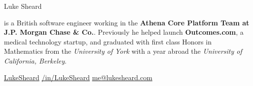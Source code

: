
\newcommand{\social}[3]{{
#1
\hspace{3pt}
\href{#2}{#3}
}}

{\Huge
  Luke Sheard
}

{\vspace{10pt}
  is a British software engineer working in the \textbf{Athena Core Platform Team at J.P. Morgan Chase \& Co.}. 
  Previously he helped launch \textbf{Outcomes.com}, a medical technology startup, 
  and graduated with first class Honors in Mathematics from the \textit{University of York}
  with a year abroad the \textit{University of California, Berkeley}.
}

\vspace{5pt}

\faGithub
\hspace{3pt}
\href{https://www.github.com/LukeSheard}{LukeSheard}
\hspace{20pt}
\faLinkedin
\hspace{3pt}
\href{http://www.linkedin.com/in/lukesheard}{/in/LukeSheard}
\hspace{20pt}
\faEnvelope
\hspace{3pt}
\href{mailto:me@lukesheard.com}{me@lukesheard.com}